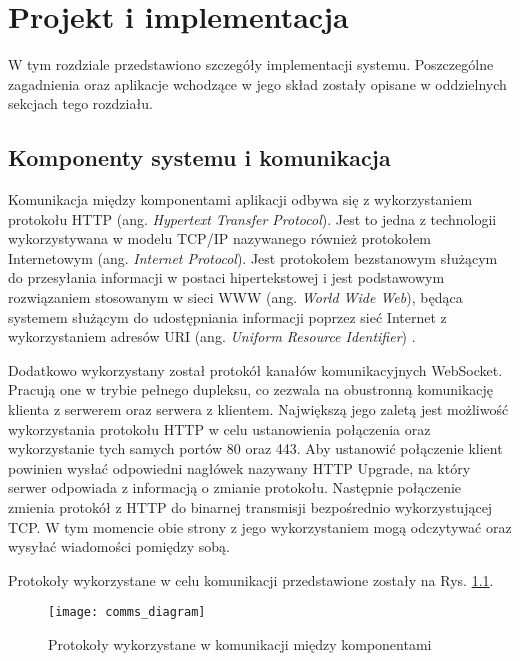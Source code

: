 \chapter{Projekt i implementacja}
W tym rozdziale przedstawiono szczegóły implementacji systemu. 
Poszczególne zagadnienia oraz aplikacje wchodzące w jego skład
zostały opisane w oddzielnych sekcjach tego rozdziału.

\section{Komponenty systemu i komunikacja}
Komunikacja między komponentami aplikacji odbywa się z wykorzystaniem protokołu 
HTTP (ang. \textit{Hypertext Transfer Protocol}).
Jest to jedna z technologii wykorzystywana w modelu TCP/IP 
nazywanego również protokołem Internetowym (ang. \textit{Internet Protocol}).
Jest protokołem bezstanowym \cite{http:rfc9110} służącym do przesyłania
informacji w postaci hipertekstowej i jest podstawowym rozwiązaniem
stosowanym w sieci WWW (ang. \textit{World Wide Web}), będąca systemem 
służącym do udostępniania informacji poprzez sieć Internet
z wykorzystaniem adresów URI (ang. \textit{Uniform Resource Identifier}) \cite{Jacobs:04:AWW}.

Dodatkowo wykorzystany został protokół kanałów komunikacyjnych WebSocket.
Pracują one w trybie pełnego dupleksu, co zezwala na obustronną komunikację
klienta z serwerem oraz serwera z klientem. Największą jego zaletą jest
możliwość wykorzystania protokołu HTTP w celu ustanowienia połączenia 
oraz wykorzystanie tych samych portów 80 oraz 443.
Aby ustanowić połączenie klient powinien wysłać odpowiedni
nagłówek nazywany HTTP Upgrade, na który serwer odpowiada z informacją o zmianie protokołu.
Następnie połączenie zmienia protokół z HTTP do binarnej transmisji bezpośrednio wykorzystującej TCP.
W tym momencie obie strony z jego wykorzystaniem mogą odczytywać oraz wysyłać wiadomości
pomiędzy sobą.

Protokoły wykorzystane w celu komunikacji przedstawione zostały na Rys. \ref{diagram:comms}.
\begin{figure}[h!]
  \centering
  \texttt{[image: comms\_diagram]}
  \caption{Protokoły wykorzystane w komunikacji między komponentami}
  \label{diagram:comms}
\end{figure}

